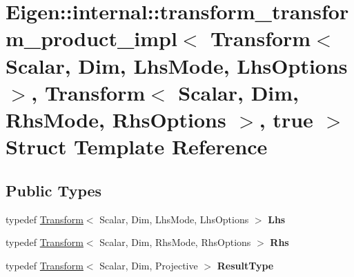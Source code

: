 \hypertarget{struct_eigen_1_1internal_1_1transform__transform__product__impl_3_01_transform_3_01_scalar_00_01d4d27ccbe125554f45d57d9ccad049c2}{}\section{Eigen\+::internal\+::transform\+\_\+transform\+\_\+product\+\_\+impl$<$ Transform$<$ Scalar, Dim, Lhs\+Mode, Lhs\+Options $>$, Transform$<$ Scalar, Dim, Rhs\+Mode, Rhs\+Options $>$, true $>$ Struct Template Reference}
\label{struct_eigen_1_1internal_1_1transform__transform__product__impl_3_01_transform_3_01_scalar_00_01d4d27ccbe125554f45d57d9ccad049c2}
\subsection*{Public Types}
\begin{DoxyCompactItemize}
\item 
\mbox{\label{struct_eigen_1_1internal_1_1transform__transform__product__impl_3_01_transform_3_01_scalar_00_01d4d27ccbe125554f45d57d9ccad049c2_a722d33f259faecdbcf058d882396dd70}} 
typedef \mbox{\hyperlink{class_eigen_1_1_transform}{Transform}}$<$ Scalar, Dim, Lhs\+Mode, Lhs\+Options $>$ {\bfseries Lhs}
\item 
\mbox{\label{struct_eigen_1_1internal_1_1transform__transform__product__impl_3_01_transform_3_01_scalar_00_01d4d27ccbe125554f45d57d9ccad049c2_aa6109d556c2eb2ca710c505a1ff70270}} 
typedef \mbox{\hyperlink{class_eigen_1_1_transform}{Transform}}$<$ Scalar, Dim, Rhs\+Mode, Rhs\+Options $>$ {\bfseries Rhs}
\item 
\mbox{\label{struct_eigen_1_1internal_1_1transform__transform__product__impl_3_01_transform_3_01_scalar_00_01d4d27ccbe125554f45d57d9ccad049c2_a5b14b1cfdb418e95a1abacac11d3551d}} 
typedef \mbox{\hyperlink{class_eigen_1_1_transform}{Transform}}$<$ Scalar, Dim, Projective $>$ {\bfseries Result\+Type}
\end{DoxyCompactItemize}
